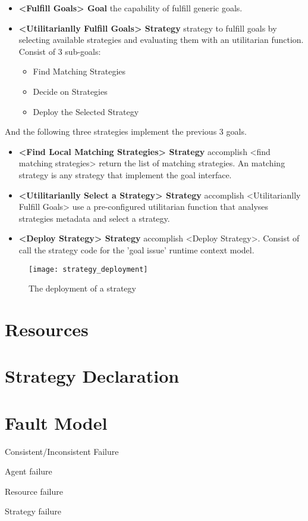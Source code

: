 \begin{itemize}
\item \textbf{<Fulfill Goals> Goal} the capability of fulfill generic goals.

\item \textbf{<Utilitarianlly Fulfill Goals> Strategy } strategy to fulfill goals by selecting available strategies and evaluating them with an utilitarian function. Consist of 3 sub-goals:
  \begin{itemize}
    \item Find Matching Strategies
    \item Decide on Strategies
    \item Deploy the Selected Strategy
  \end{itemize}
\end{itemize}

And the following three strategies implement the previous 3 goals.

\begin{itemize}
  \item \textbf{<Find Local Matching Strategies> Strategy} accomplish <find matching strategies>
  return the list of matching strategies. An matching strategy is any strategy that implement the goal interface.

  \item \textbf{<Utilitarianlly Select a Strategy> Strategy} accomplish <Utilitarianlly Fulfill Goals>
  use a pre-configured utilitarian function that analyses strategies metadata and select a strategy.

  \item \textbf{<Deploy Strategy> Strategy} accomplish <Deploy Strategy>.
  Consist of call the strategy code for the 'goal issue' runtime context model.
\end{itemize}


\begin{figure}
  \centering
  \texttt{[image: strategy\_deployment]}
  \caption{The deployment of a strategy}
  \label{fig:agent_composition}
\end{figure}

\section{Resources}

\section{Strategy Declaration}


\section{Fault Model}
Consistent/Inconsistent Failure

Agent failure

Resource failure

Strategy failure
